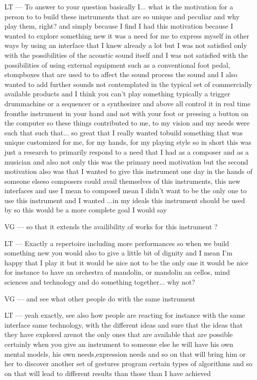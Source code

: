 LT — To answer to your question basically I... what is the motivation for a person to to build these instruments that are so unique and peculiar and why play them, right? and simply because I find I had this motivation because I wanted to explore something new it was a need for me to express myself in other ways by using an interface that I knew already a lot but I was not satisfied only with the possibilities of the acoustic sound itself and I was not satisfied with the possibilities of using external equipment such as a conventional foot pedal, stompboxes that are used to to affect the sound process the sound and I also wanted to add further sounds not contemplated in the typical set of commercially available products and I think you can't play something typically a trigger drummachine or a sequencer or a synthesizer and above all control it in real time fromthe instrument in your hand and not with your foot or pressing a button on the computer so these things contributed to me, to my vision and my needs were such that such that... so great that I really wanted tobuild something that was unique customized for me, for my hands, for my playing style so in short this was just a research to primarily respond to a need that I had as a composer and as a musician and also not only this was the primary need motivation but the second motivation also was that I wanted to give this instrument one day in the hands of someone elseso composers could avail themselves of this instruments, this new interfaces and use I mean to composeI mean I didn't want to be the only one to use this instrument and I wanted ...in my ideals this instrument should be used by so this would be a more complete goal I would say

VG — so that it extends the availibility of works for this instrument ?

LT — Exactly a repertoire including more performances so when we build something new you would also to give a little bit of dignity and I mean I'm happy that I play it but it would be nice not to be the only one it would be nice for instance to have an orchestra of mandolin, or mandolin an cellos, mind sciences and technology and do something together... why not?

VG — and see what other people do with the same instrument

LT — yeah exactly, see also how people are reacting for instance with the same interface same technology, with the different ideas and sure that the ideas that they have explored arenot the only ones that are available that are possible certainly when you give an instrument to someone else he will have his own mental models, his own needs,expression needs and so on that will bring him or her to discover another set of gestures program certain types of algorithms and so on that will lead to different results than those than I have achieved

